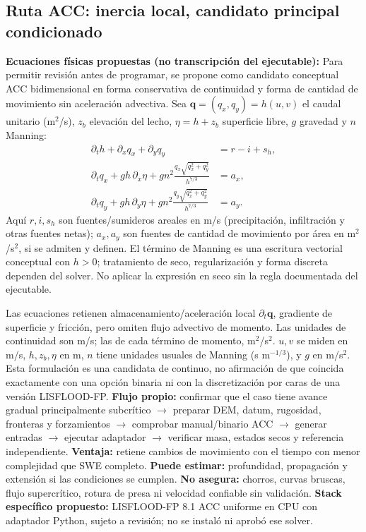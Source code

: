 \documentclass[11pt,a4paper]{article}
\begin{document}
\subsection{Ruta ACC: inercia local, candidato principal condicionado}
\textbf{Ecuaciones físicas propuestas (no transcripción del ejecutable):}
Para permitir revisión antes de programar, se propone como candidato conceptual ACC bidimensional en forma conservativa de continuidad y forma de cantidad de movimiento sin aceleración advectiva. Sea $\boldsymbol{q}=(q_x,q_y)=h(u,v)$ el caudal unitario (m$^2$/s), $z_b$ elevación del lecho, $\eta=h+z_b$ superficie libre, $g$ gravedad y $n$ Manning:
\begin{align}
\partial_t h+\partial_x q_x+\partial_y q_y &= r-i+s_h, \label{eq:mass}\\
\partial_t q_x+g h\,\partial_x\eta+g n^2\frac{q_x\sqrt{q_x^2+q_y^2}}{h^{7/3}} &= a_x, \label{eq:accx}\\
\partial_t q_y+g h\,\partial_y\eta+g n^2\frac{q_y\sqrt{q_x^2+q_y^2}}{h^{7/3}} &= a_y. \label{eq:accy}
\end{align}
Aquí $r,i,s_h$ son fuentes/sumideros areales en m/s (precipitación, infiltración y otras fuentes netas); $a_x,a_y$ son fuentes de cantidad de movimiento por área en m$^2$/s$^2$, si se admiten y definen. El término de Manning es una escritura vectorial conceptual con $h>0$; tratamiento de seco, regularización y forma discreta dependen del solver. No aplicar la expresión en seco sin la regla documentada del ejecutable.

Las ecuaciones retienen almacenamiento/aceleración local $\partial_t\boldsymbol q$, gradiente de superficie y fricción, pero omiten flujo advectivo de momento. Las unidades de continuidad son m/s; las de cada término de momento, m$^2$/s$^2$. $u,v$ se miden en m/s, $h,z_b,\eta$ en m, $n$ tiene unidades usuales de Manning (s m$^{-1/3}$), y $g$ en m/s$^2$. Esta formulación es una candidata de continuo, no afirmación de que coincida exactamente con una opción binaria ni con la discretización por caras de una versión LISFLOOD-FP.
\textbf{Flujo propio:} confirmar que el caso tiene avance gradual principalmente subcrítico $\rightarrow$ preparar DEM, datum, rugosidad, fronteras y forzamientos $\rightarrow$ comprobar manual/binario ACC $\rightarrow$ generar entradas $\rightarrow$ ejecutar adaptador $\rightarrow$ verificar masa, estados secos y referencia independiente. \textbf{Ventaja:} retiene cambios de movimiento con el tiempo con menor complejidad que SWE completo. \textbf{Puede estimar:} profundidad, propagación y extensión si las condiciones se cumplen. \textbf{No asegura:} chorros, curvas bruscas, flujo supercrítico, rotura de presa ni velocidad confiable sin validación. \textbf{Stack específico propuesto:} LISFLOOD-FP 8.1 ACC uniforme en CPU con adaptador Python, sujeto a revisión; no se instaló ni aprobó ese solver.
\end{document}
